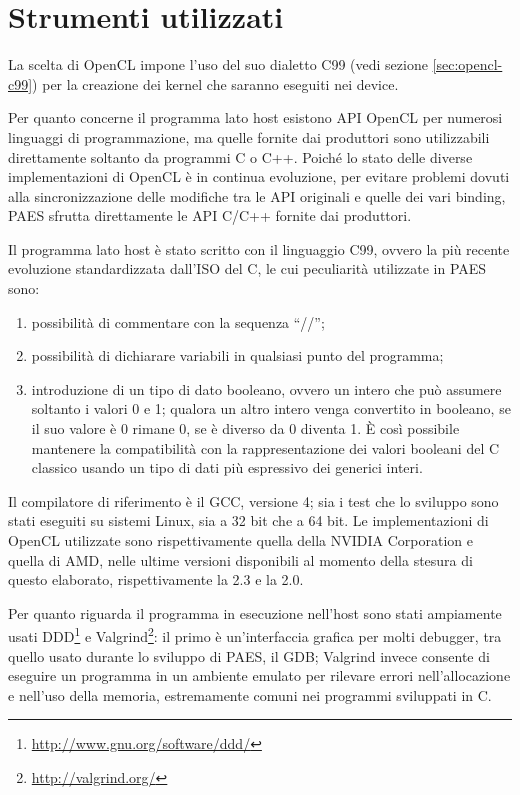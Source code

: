 \documentclass[12pt,a4paper,oneside]{book}
\begin{document}
\section{Strumenti utilizzati}

La scelta di \ac{OpenCL} impone l'uso del suo dialetto C99 (vedi sezione \ref{sec:opencl-c99}) per la creazione dei kernel che saranno eseguiti nei device.

Per quanto concerne il programma lato host esistono \ac{API} \ac{OpenCL} per numerosi linguaggi di programmazione, ma quelle fornite dai produttori sono utilizzabili direttamente soltanto da programmi C o C++. Poiché lo stato delle diverse implementazioni di \ac{OpenCL} è in continua evoluzione, per evitare problemi dovuti alla sincronizzazione delle modifiche tra le \ac{API} originali e quelle dei vari binding, PAES sfrutta direttamente le \ac{API} C/C++ fornite dai produttori.

Il programma lato host è stato scritto con il linguaggio C99, ovvero la più recente evoluzione standardizzata dall'\ac{ISO} del C, le cui peculiarità utilizzate in PAES sono:
\begin{enumerate}
\item possibilità di commentare con la sequenza ``//'';
\item possibilità di dichiarare variabili in qualsiasi punto del programma;
\item introduzione di un tipo di dato booleano, ovvero un intero che può assumere soltanto i valori 0 e 1; qualora un altro intero venga convertito in booleano, se il suo valore è 0 rimane 0, se è diverso da 0 diventa 1. È così possibile mantenere la compatibilità con la rappresentazione dei valori booleani del C classico usando un tipo di dati più espressivo dei generici interi.
\end{enumerate}

Il compilatore di riferimento è il GCC, versione 4; sia i test che lo sviluppo sono stati eseguiti su sistemi Linux, sia a 32 bit che a 64 bit. Le implementazioni di \ac{OpenCL} utilizzate sono rispettivamente quella della NVIDIA Corporation e quella di AMD, nelle ultime versioni disponibili al momento della stesura di questo elaborato, rispettivamente la 2.3 e la 2.0.

Per quanto riguarda il programma in esecuzione nell'host sono stati ampiamente usati \ac{DDD}\footnote{\url{http://www.gnu.org/software/ddd/}} e Valgrind\footnote{\url{http://valgrind.org/}}: il primo è un'interfaccia grafica per molti debugger, tra quello usato durante lo sviluppo di PAES, il \ac{GDB}; Valgrind invece consente di eseguire un programma in un ambiente emulato per rilevare errori nell'allocazione e nell'uso della memoria, estremamente comuni nei programmi sviluppati in C.
\end{document}
